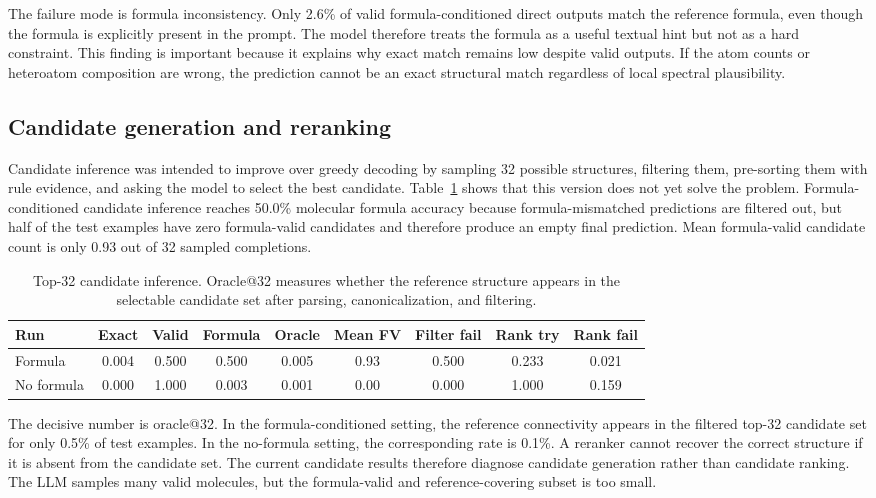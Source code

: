 \documentclass{article}
\begin{document}
The failure mode is formula inconsistency. Only 2.6\% of valid formula-conditioned direct outputs match the reference formula, even though the formula is explicitly present in the prompt. The model therefore treats the formula as a useful textual hint but not as a hard constraint. This finding is important because it explains why exact match remains low despite valid outputs. If the atom counts or heteroatom composition are wrong, the prediction cannot be an exact structural match regardless of local spectral plausibility.

\subsection{Candidate generation and reranking}

Candidate inference was intended to improve over greedy decoding by sampling 32 possible structures, filtering them, pre-sorting them with rule evidence, and asking the model to select the best candidate. Table~\ref{tab:candidates} shows that this version does not yet solve the problem. Formula-conditioned candidate inference reaches 50.0\% molecular formula accuracy because formula-mismatched predictions are filtered out, but half of the test examples have zero formula-valid candidates and therefore produce an empty final prediction. Mean formula-valid candidate count is only 0.93 out of 32 sampled completions.

\begin{table}[t]
\centering
\caption{Top-32 candidate inference. Oracle@32 measures whether the reference structure appears in the selectable candidate set after parsing, canonicalization, and filtering.}
\label{tab:candidates}
\scriptsize
\setlength{\tabcolsep}{3pt}
\begin{tabular}{@{}lcccccccc@{}}
\toprule
Run & Exact & Valid & Formula & Oracle & Mean FV & Filter fail & Rank try & Rank fail \\
\midrule
Formula & 0.004 & 0.500 & 0.500 & 0.005 & 0.93 & 0.500 & 0.233 & 0.021 \\
No formula & 0.000 & 1.000 & 0.003 & 0.001 & 0.00 & 0.000 & 1.000 & 0.159 \\
\bottomrule
\end{tabular}
\end{table}

The decisive number is oracle@32. In the formula-conditioned setting, the reference connectivity appears in the filtered top-32 candidate set for only 0.5\% of test examples. In the no-formula setting, the corresponding rate is 0.1\%. A reranker cannot recover the correct structure if it is absent from the candidate set. The current candidate results therefore diagnose candidate generation rather than candidate ranking. The LLM samples many valid molecules, but the formula-valid and reference-covering subset is too small.
\end{document}
